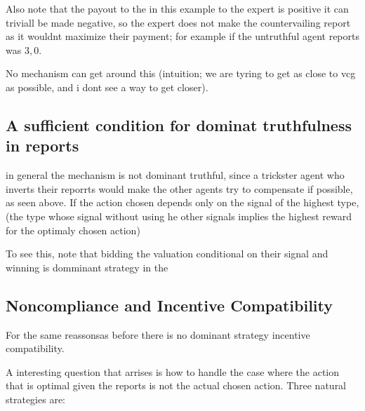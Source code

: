 Also note that the payout to the in this example to the expert is positive it can triviall be made negative, so the expert does not make the countervailing report as it wouldnt maximize their payment; for example if the untruthful agent reports was $3,0$.

\begin{con}
	No mechanism can get around this (intuition; we are tyring to get as close to vcg as possible, and i dont see a way to get closer).
\end{con}

\subsection{A sufficient condition for dominat truthfulness in reports}

in general the mechanism is not dominant truthful, since a trickster agent who inverts their reporrts would make the other agents try to compensate if possible, as seen above.
If the action chosen depends only on the signal of the highest type, (the type whose signal without using he other signals implies the highest reward for the optimaly chosen action) 

To see this, note that bidding the valuation conditional on their signal and winning is domminant strategy in the 

\subsection{Noncompliance and Incentive Compatibility}

For the same reassonsas before there is no dominant strategy incentive compatibility. 

A interesting question that arrises is how to handle the case where the action that is optimal given the reports is not the actual chosen action. Three natural strategies are:

